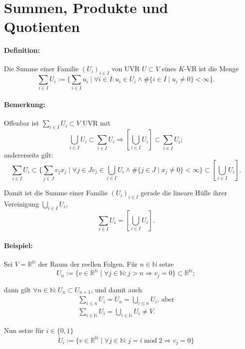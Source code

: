 \section{Summen, Produkte und Quotienten}
\paragraph{Definition: }
	Die Summe einer Familie $ (U_i)_{i\in I} $ von UVR $ U\subset V $ eines $ K $-VR ist die Menge
		\begin{equation*}
		\sum_{i\in I} U_i := \{\sum_{i \in I}u_i\mid \forall i\in I: u_i\in U_i \land \# \{i\in I\mid u_i \neq 0\}<\infty\}.
		\end{equation*}
		
\paragraph{Bemerkung: }
	Offenbar ist $ \sum_{i\in I} U_i\subset V $ UVR mit
	\[  \bigcup_{i\in I}U_i \subset \sum_{i\in I} U_i \Rightarrow [\bigcup_{i\in I}U_i]\subset \sum_{i\in I} U_i; \]
	andererseits gilt:
	\[ \sum_{i\in I}U_i \subset \{\sum_{j\in J}v_jx_j\mid \forall j\in Jv_j\in \bigcup_{i\in I}U_i \land \#\{j\in J\mid x_j\neq 0\}<\infty\}\subset [\bigcup_{i\in I}U_i]. \]
	
	Damit ist die Summe einer Familie $ (U_i)_{i\in I} $ gerade die lineare Hülle ihrer Vereinigung $ \bigcup_{i\in I}U_i $,
	\[ \sum_{i\in I}U_i= [\bigcup_{i\in I}U_i]. \]
		
\paragraph{Beispiel: }
	Sei $ V=\mathbb{R}^\mathbb{N} $ der Raum der reellen Folgen. Für $ n\in \mathbb{N} $ setze
		\begin{equation*}
		U_n := \{v\in \mathbb{R}^\mathbb{N}\mid \forall j\in \mathbb{N}: j>n\Rightarrow v_j = 0 \} \subset \mathbb{R}^\mathbb{N};
		\end{equation*}
		
	dann gilt $ \forall n\in \mathbb{N}: U_n\subset U_{n+1} $, und damit auch
		\begin{gather*}
		\sum_{i\leq n} U_i = U_n = \bigcup_{i\leq n}U_i \text{, aber}\\
		\sum_{i\in \mathbb{N}}U_i = \bigcup_{i\in \mathbb{N}}U_i \neq V.
		\end{gather*}
		
	Nun setze für $ i\in \{0,1\} $
		\begin{equation*}
		\tilde{U}_i := \{v\in \mathbb{R}^\mathbb{N}\mid \forall j\in \mathbb{N}: j=i\operatorname{mod} 2\Rightarrow v_j = 0\}
		\end{equation*}
		
